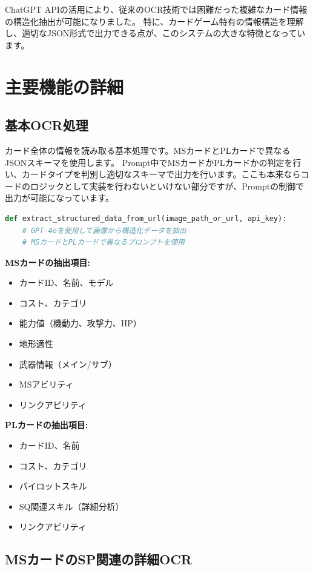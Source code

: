 ChatGPT APIの活用により、従来のOCR技術では困難だった複雑なカード情報の構造化抽出が可能になりました。
特に、カードゲーム特有の情報構造を理解し、適切なJSON形式で出力できる点が、このシステムの大きな特徴となっています。

\section*{主要機能の詳細}

\subsection*{基本OCR処理}

カード全体の情報を読み取る基本処理です。MSカードとPLカードで異なるJSONスキーマを使用します。
Prompt中でMSカードかPLカードかの判定を行い、カードタイプを判別し適切なスキーマで出力を行います。ここも本来ならコードのロジックとして実装を行わないといけない部分ですが、Promptの制御で出力が可能になっています。

\begin{lstlisting}[language=Python]
def extract_structured_data_from_url(image_path_or_url, api_key):
    # GPT-4oを使用して画像から構造化データを抽出
    # MSカードとPLカードで異なるプロンプトを使用
\end{lstlisting}

\textbf{MSカードの抽出項目:}
\begin{itemize}
    \item カードID、名前、モデル
    \item コスト、カテゴリ
    \item 能力値（機動力、攻撃力、HP）
    \item 地形適性
    \item 武器情報（メイン/サブ）
    \item MSアビリティ
    \item リンクアビリティ
\end{itemize}

\textbf{PLカードの抽出項目:}
\begin{itemize}
    \item カードID、名前
    \item コスト、カテゴリ
    \item パイロットスキル
    \item SQ関連スキル（詳細分析）
    \item リンクアビリティ
\end{itemize}

\subsection*{MSカードのSP関連の詳細OCR}

